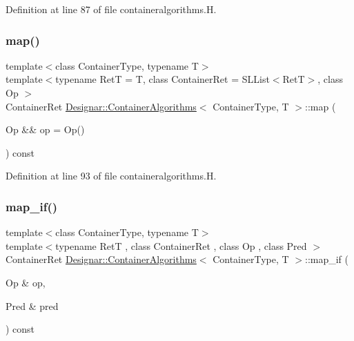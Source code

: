 Definition at line 87 of file containeralgorithms.\+H.

\mbox{\label{class_designar_1_1_container_algorithms_a9c49c11af28a3093dd133b65a115853b}} 
\subsubsection{\texorpdfstring{map()}{map()}\hspace{0.1cm}{\footnotesize\ttfamily [2/2]}}
{\footnotesize\ttfamily template$<$class Container\+Type, typename T$>$ \\
template$<$typename RetT  = T, class Container\+Ret  = S\+L\+List$<$\+Ret\+T$>$, class Op $>$ \\
Container\+Ret \hyperlink{class_designar_1_1_container_algorithms}{Designar\+::\+Container\+Algorithms}$<$ Container\+Type, T $>$\+::map (\begin{DoxyParamCaption}\item[{Op \&\&}]{op = {\ttfamily Op()} }\end{DoxyParamCaption}) const\hspace{0.3cm}{\ttfamily [inline]}}



Definition at line 93 of file containeralgorithms.\+H.

\mbox{\label{class_designar_1_1_container_algorithms_a9209d9ddf0b4dd85301735c99bcdb171}} 
\subsubsection{\texorpdfstring{map\+\_\+if()}{map\_if()}\hspace{0.1cm}{\footnotesize\ttfamily [1/4]}}
{\footnotesize\ttfamily template$<$class Container\+Type, typename T$>$ \\
template$<$typename RetT , class Container\+Ret , class Op , class Pred $>$ \\
Container\+Ret \hyperlink{class_designar_1_1_container_algorithms}{Designar\+::\+Container\+Algorithms}$<$ Container\+Type, T $>$\+::map\+\_\+if (\begin{DoxyParamCaption}\item[{Op \&}]{op,  }\item[{Pred \&}]{pred }\end{DoxyParamCaption}) const\hspace{0.3cm}{\ttfamily [inline]}}



